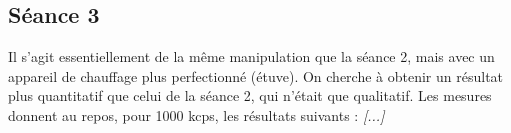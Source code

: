 \documentclass[french]{article}
\begin{document}
\subsection{Séance 3}

Il s'agit essentiellement de la même manipulation que la séance 2, mais avec un appareil de chauffage plus perfectionné (étuve). On cherche à obtenir un résultat plus quantitatif que celui de la séance 2, qui n'était que qualitatif. Les mesures donnent au repos, pour 1000 kcps, les résultats suivants : \textit{[...]}
\end{document}
